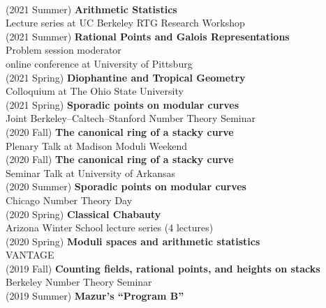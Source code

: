 \documentclass[margin,line]{res}
\begin{document}
\begin{resume}
\vspace{.05cm}\\
(2021 Summer) \textbf{Arithmetic Statistics}\\
Lecture series at UC Berkeley RTG Research Workshop
\vspace{.05cm}\\
(2021 Summer) \textbf{Rational Points and Galois Representations}\\
Problem session moderator\\ online conference at University of Pittsburg
\vspace{.05cm}\\
(2021 Spring) \textbf{Diophantine and Tropical Geometry}\\
Colloquium at The Ohio State University 
\vspace{.05cm}\\
(2021 Spring) \textbf{Sporadic points on modular curves}\\
Joint Berkeley--Caltech--Stanford Number Theory Seminar
\vspace{.05cm}\\
(2020 Fall) \textbf{The canonical ring of a stacky curve}\\  
Plenary Talk at Madison Moduli Weekend 
\vspace{.05cm}\\
(2020 Fall) \textbf{The canonical ring of a stacky curve}\\  
Seminar Talk at University of Arkansas
\vspace{.05cm}\\
(2020 Summer) \textbf{Sporadic points on modular curves}\\
Chicago Number Theory Day 
\vspace{.05cm}\\
(2020 Spring) \textbf{Classical Chabauty}\\
Arizona Winter School lecture series (4 lectures)
\vspace{.05cm}\\
(2020 Spring) \textbf{Moduli spaces and arithmetic statistics}\\
VANTAGE
\vspace{.05cm}\\
(2019 Fall) \textbf{Counting fields, rational points, and heights on stacks}\\
Berkeley Number Theory Seminar
\vspace{.05cm}\\
(2019 Summer) \textbf{Mazur's ``Program B''}\\  

\end{resume}
\end{document}
